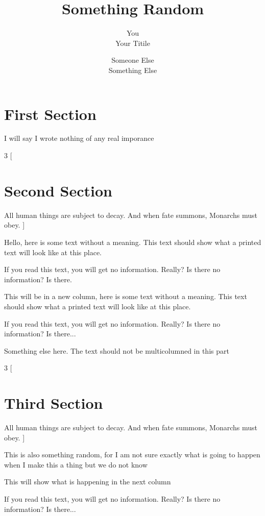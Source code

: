 \documentclass{article}
\title{Something Random}
\author{You \\ Your Titile 
\and Someone Else\\ Something Else }
\begin{document}
	
	
\maketitle

\section{First Section}

I will say I wrote nothing of any real imporance 

\begin{multicols}{3}
[
\section{Second Section}
All human things are subject to decay. And when fate summons, Monarchs must obey.
]

Hello, here is some text without a meaning.  This text should show what 
a printed text will look like at this place.

If you read this text, you will get no information.  Really?  Is there 
no information?  Is there.

\columnbreak

This will be in a new column, here is some text without a meaning.  This text 
should show what a printed text will look like at this place.

If you read this text, you will get no information.  Really?  Is there 
no information?  Is there...
\end{multicols}

Something else here. The text should not be multicolumned in this part

\begin{multicols}{3}
[
\section{Third Section}
All human things are subject to decay. And when fate summons, Monarchs must obey.
]

This is also something random, for I am not sure exactly what is going to happen when I make this a thing
but we do not know 

\columnbreak

This will show what is happening in the next column

If you read this text, you will get no information.  Really?  Is there 
no information?  Is there...
\end{multicols}
\end{document}
